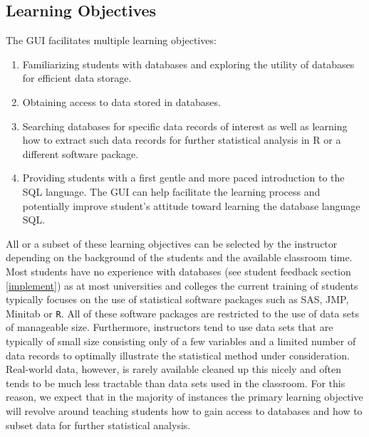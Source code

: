 \documentclass[11pt]{tise_style}
\begin{document}
\subsection{{Learning Objectives}}

%

The GUI facilitates multiple learning objectives: 

\begin{enumerate}
	\item Familiarizing students with databases and exploring the utility of databases for efficient data storage.
	\item Obtaining access to data stored in databases. 
	\item Searching databases for specific data records of interest as well as learning how to extract such data records for further statistical analysis in R or a different software package. 
	\item Providing students with a first gentle and more paced introduction to the SQL language. The GUI can help facilitate the learning process and potentially improve student's attitude toward learning the database language SQL.
\end{enumerate}	
 
All or a subset of these learning objectives can be selected by the instructor depending on the background of the students and the available classroom time.\\
Most students have no experience with databases (see student feedback section \ref{implement}) as at most universities and colleges the current training of students typically focuses on the use of statistical software packages such as SAS, JMP, Minitab or {\tt R}. All of these software packages are restricted to the use of data sets of manageable size. Furthermore, instructors tend to use data sets that are typically of small size consisting only of a few variables and a limited number of data records to optimally illustrate the statistical method under consideration.  Real-world data, however, is rarely available cleaned up this nicely and often tends to be much less tractable than data sets used in the classroom.   For this reason, we expect that in the majority of instances the primary learning objective will revolve around teaching students how to gain access to databases and how to subset data for further statistical analysis.
\end{document}
